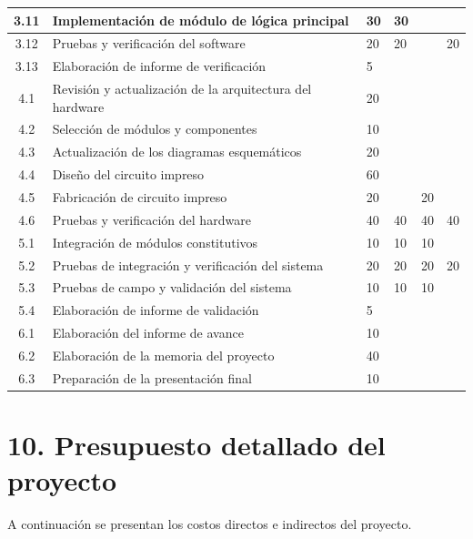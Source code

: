 \documentclass[11pt]{charter}
\begin{document}
\begin{table}[!htpb]
\begin{center}
\begin{tabularx}{\linewidth}{@{}|c|X|m{0.8cm}|m{1.4cm}|m{1.3cm}|m{1.1cm}|@{}}
  3.11 & Implementación de módulo de lógica principal & 30 & 30 & & \\ \hline
  3.12 & Pruebas y verificación del software & 20 & 20 & & 20 \\ \hline
  3.13 & Elaboración de informe de verificación & 5 & & & \\ \hline
  4.1 & Revisión y actualización de la arquitectura del hardware & 20 & & & \\ \hline
  4.2 & Selección de módulos y componentes & 10 & & & \\ \hline
  4.3 & Actualización de los diagramas esquemáticos & 20 & & & \\  \hline
  4.4 & Diseño del circuito impreso & 60 & & & \\ \hline
  4.5 & Fabricación de circuito impreso & 20 & & 20 & \\  \hline
  4.6 & Pruebas y verificación del hardware & 40 & 40 & 40 & 40 \\ \hline
  5.1 & Integración de módulos constitutivos & 10 & 10 & 10 & \\ \hline
  5.2 & Pruebas de integración y verificación del sistema & 20 & 20 & 20 & 20 \\ \hline
  5.3 & Pruebas de campo y validación del sistema & 10 & 10 & 10 & \\ \hline
  5.4 & Elaboración de informe de validación & 5 & & & \\ \hline
  6.1 & Elaboración del informe de avance & 10 & & & \\ \hline
  6.2 & Elaboración de la memoria del proyecto & 40 & & & \\ \hline
  6.3 & Preparación de la presentación final & 10 & & & \\ \hline
  \end{tabularx}
\end{center}
\label{tab:recursos}
\end{table}

\newpage

\section{10. Presupuesto detallado del proyecto}
\label{sec:presupuesto}

A continuación se presentan los costos directos e indirectos del proyecto.
\end{document}
